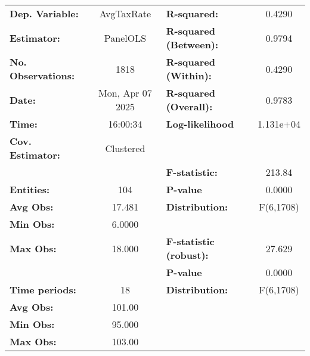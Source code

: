 \begin{center}
\begin{tabular}{lclc}
\toprule
\textbf{Dep. Variable:}              &     AvgTaxRate     & \textbf{  R-squared:         }   &      0.4290      \\
\textbf{Estimator:}                  &      PanelOLS      & \textbf{  R-squared (Between):}  &      0.9794      \\
\textbf{No. Observations:}           &        1818        & \textbf{  R-squared (Within):}   &      0.4290      \\
\textbf{Date:}                       &  Mon, Apr 07 2025  & \textbf{  R-squared (Overall):}  &      0.9783      \\
\textbf{Time:}                       &      16:00:34      & \textbf{  Log-likelihood     }   &    1.131e+04     \\
\textbf{Cov. Estimator:}             &     Clustered      & \textbf{                     }   &                  \\
\textbf{}                            &                    & \textbf{  F-statistic:       }   &      213.84      \\
\textbf{Entities:}                   &        104         & \textbf{  P-value            }   &      0.0000      \\
\textbf{Avg Obs:}                    &       17.481       & \textbf{  Distribution:      }   &    F(6,1708)     \\
\textbf{Min Obs:}                    &       6.0000       & \textbf{                     }   &                  \\
\textbf{Max Obs:}                    &       18.000       & \textbf{  F-statistic (robust):} &      27.629      \\
\textbf{}                            &                    & \textbf{  P-value            }   &      0.0000      \\
\textbf{Time periods:}               &         18         & \textbf{  Distribution:      }   &    F(6,1708)     \\
\textbf{Avg Obs:}                    &       101.00       & \textbf{                     }   &                  \\
\textbf{Min Obs:}                    &       95.000       & \textbf{                     }   &                  \\
\textbf{Max Obs:}                    &       103.00       & \textbf{                     }   &                  \\

\end{tabular}
\end{center}
